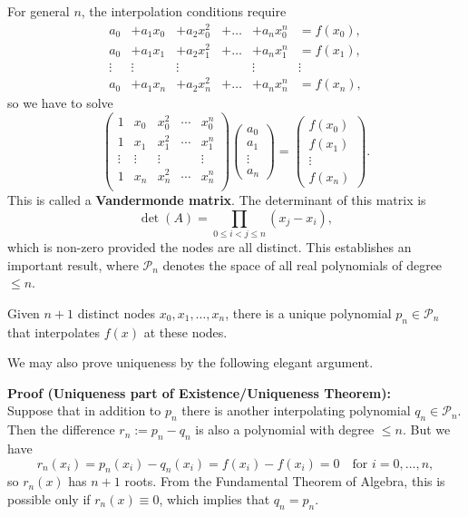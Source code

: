 \documentclass[
  letterpaper,
  DIV=11,
  numbers=noendperiod]{scrreprt}
\newenvironment{fbxSimple}[3]{\begin{tcolorbox}[enhanced, breakable,%
attach boxed title to top*={xshift=1.4pt},
boxed title style={boxrule=0.0mm, fuzzy shadow={1pt}{-1pt}{0mm}{0.1mm}{gray}, arc=.3em, rounded corners=east, sharp corners=west}, colframe=#1-color2, colbacktitle=#1-color1, colback = white, coltitle=black,  titlerule=0mm, toprule=0pt, bottomrule=.7pt, leftrule=.3em, rightrule=.7pt, outer arc=.3em,  	left=.5em, right=.5em, bottomtitle=1mm, toptitle=1mm,title=\textbf{#2}\hspace{0.5em}{#3}]}
{\end{tcolorbox}}
\begin{document}
For general \(n\), the interpolation conditions require \[
\begin{matrix}
a_0 &+ a_1x_0 &+ a_2x_0^2 &+ \ldots &+ a_nx_0^n &= f(x_0),\\
a_0 &+ a_1x_1 &+ a_2x_1^2 &+ \ldots &+ a_nx_1^n &= f(x_1),\\
\vdots  & \vdots  & \vdots     &        &\vdots      & \vdots\\
a_0 &+ a_1x_n &+ a_2x_n^2 &+ \ldots &+ a_nx_n^n &= f(x_n),
\end{matrix}
\] so we have to solve \[
\begin{pmatrix}
1 & x_0 & x_0^2 & \cdots & x_0^n\\
1 & x_1 & x_1^2 & \cdots & x_1^n\\
\vdots & \vdots &\vdots& & \vdots\\
1 & x_n & x_n^2 & \cdots & x_n^n\\
\end{pmatrix}
\begin{pmatrix}
a_0\\ a_1\\ \vdots\\ a_n
\end{pmatrix}
=
\begin{pmatrix}
f(x_0)\\ f(x_1)\\ \vdots\\ f(x_n)
\end{pmatrix}.
\] This is called a \textbf{Vandermonde matrix}. The determinant of this
matrix is \[
\det(A) = \prod_{0\leq i < j\leq n} (x_j - x_i),
\] which is non-zero provided the nodes are all distinct. This
establishes an important result, where \(\mathcal{P}_n\) denotes the
space of all real polynomials of degree \(\leq n\).

\label{existenceuniqueness}
\begin{fbxSimple}{theorem}{Theorem 2.4: }{Existence/uniqueness}
\label{existenceuniqueness}
Given \(n+1\) distinct nodes \(x_0, x_1, \ldots, x_n\), there is a
unique polynomial \(p_n\in\mathcal{P}_n\) that interpolates \(f(x)\) at
these nodes.

\end{fbxSimple}

We may also prove uniqueness by the following elegant argument.

\textbf{Proof (Uniqueness part of Existence/Uniqueness Theorem):}\\
Suppose that in addition to \(p_n\) there is another interpolating
polynomial \(q_n\in\mathcal{P}_n\). Then the difference
\(r_n := p_n - q_n\) is also a polynomial with degree \(\leq n\). But we
have \[
r_n(x_i) = p_n(x_i) - q_n(x_i) = f(x_i)-f(x_i)=0 \quad \textrm{for $i=0,\ldots,n$},
\] so \(r_n(x)\) has \(n+1\) roots. From the Fundamental Theorem of
Algebra, this is possible only if \(r_n(x)\equiv 0\), which implies that
\(q_n=p_n\).
\end{document}
